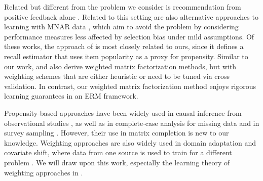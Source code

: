 \documentclass{article}
\begin{document}
Related but different from the problem we consider is recommendation from positive feedback alone \cite{Hu/etal/08,blei2016exposure}. Related to this setting are also alternative approaches to learning with MNAR data \cite{Steck,Steck/11,Lim/etal/15}, which aim to avoid the problem by considering performance measures less affected by selection bias under mild assumptions. Of these works, the approach of \citet{Steck/11} is most closely related to ours, since it defines a recall estimator that uses item popularity as a proxy for propensity. Similar to our work, \citet{Steck,Steck/11} and \citet{Hu/etal/08} also derive weighted matrix factorization methods, but with weighting schemes that are either heuristic or need to be tuned via cross validation. In contrast, our weighted matrix factorization method enjoys rigorous learning guarantees in an ERM framework.

Propensity-based approaches have been widely used in causal inference from observational studies \cite{Imbens/Rubin/15}, as well as in complete-case analysis for missing data \cite{rubin2002mnar,seaman2013review} and in survey sampling \cite{Thompson/12}.  However, their use %
in matrix completion is new to our knowledge. Weighting approaches are also widely used in domain adaptation and covariate shift, where data from one source is used to train for a different problem \citep[e.g.,][]{Huang/etal/06,Bickel/etal/09,Sugiyama/Kawanabe/12}. We will draw upon this work, especially the learning theory of weighting approaches in \cite{Cortes/etal/08,Cortes/etal/10}.%
\end{document}
